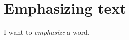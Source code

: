 \documentclass[a4paper,12pt]{article}
\begin{document}
	\section*{Emphasizing text}
	I want to \emph{emphasize} a word.
		
\end{document}
